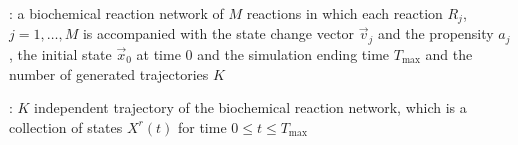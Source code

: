 \begin{algorithm}[H]
\DontPrintSemicolon
{}

\caption{\protect\TitleFunction{}}
\label{algo:srssa}

\Input: a biochemical reaction network of $M$ reactions in which each reaction $R_j$, $j=1, \dots, M$ is accompanied with the state change vector $\vec{v}_j$ and the propensity $a_j$, the initial state $\vec{x}_0$ at time $0$ and the simulation ending time $T_{\max}$ and the number of generated trajectories $K$\;

\Output: $K$ independent trajectory of the biochemical reaction network, which is a collection of states $X^r(t)$ for time $0\le t\le T_{\max}$\;

\end{algorithm}
